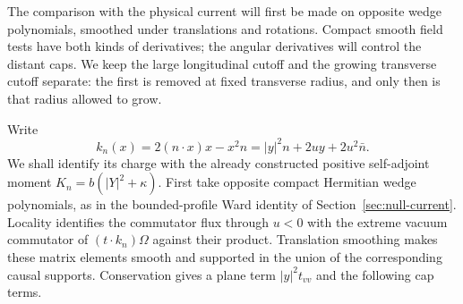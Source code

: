 The comparison with the physical current will first be made on
opposite wedge polynomials, smoothed under translations and rotations.
Compact smooth field tests have both kinds of derivatives; the angular
derivatives will control the distant caps. We keep
the large longitudinal cutoff and the growing transverse cutoff
separate: the first is removed at fixed transverse radius, and only
then is that radius allowed to grow.

Write
\[
 k_n(x)=2(n\cdot x)x-x^2n
       =|y|^2n+2uy+2u^2\bar n.
\]
We shall identify its charge with the already constructed positive
self-adjoint moment
$K_n=b(|Y|^2+\kappa)$. First take opposite compact Hermitian wedge
polynomials, as in the bounded-profile Ward identity of
Section~\ref{sec:null-current}. Locality identifies the commutator
flux through $u<0$ with the extreme vacuum commutator of
$(t\cdot k_n)\Omega$ against their product. Translation smoothing
makes these matrix elements smooth and supported in the union of
the corresponding causal supports. Conservation gives a plane
term $|y|^2t_{vv}$ and the following cap terms.


